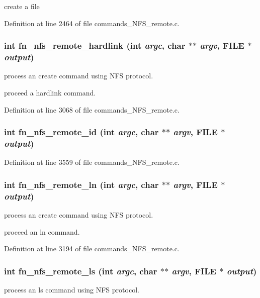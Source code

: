 create a file 

Definition at line 2464 of file commands\_\-NFS\_\-remote.c.
\subsubsection[{fn\_\-nfs\_\-remote\_\-hardlink}]{\setlength{\rightskip}{0pt plus 5cm}int fn\_\-nfs\_\-remote\_\-hardlink (int {\em argc}, \/  char $\ast$$\ast$ {\em argv}, \/  FILE $\ast$ {\em output})}\label{commands_8h_ad279971191c169cab4a91142e7346a68}
process an create command using NFS protocol.

proceed a hardlink command. 

Definition at line 3068 of file commands\_\-NFS\_\-remote.c.
\subsubsection[{fn\_\-nfs\_\-remote\_\-id}]{\setlength{\rightskip}{0pt plus 5cm}int fn\_\-nfs\_\-remote\_\-id (int {\em argc}, \/  char $\ast$$\ast$ {\em argv}, \/  FILE $\ast$ {\em output})}\label{commands_8h_adfe70596d1556c3acd01ba17fbe7bda8}


Definition at line 3559 of file commands\_\-NFS\_\-remote.c.
\subsubsection[{fn\_\-nfs\_\-remote\_\-ln}]{\setlength{\rightskip}{0pt plus 5cm}int fn\_\-nfs\_\-remote\_\-ln (int {\em argc}, \/  char $\ast$$\ast$ {\em argv}, \/  FILE $\ast$ {\em output})}\label{commands_8h_ae4a85d683c2bf488befc5192af4a2490}
process an create command using NFS protocol.

proceed an ln command. 

Definition at line 3194 of file commands\_\-NFS\_\-remote.c.
\subsubsection[{fn\_\-nfs\_\-remote\_\-ls}]{\setlength{\rightskip}{0pt plus 5cm}int fn\_\-nfs\_\-remote\_\-ls (int {\em argc}, \/  char $\ast$$\ast$ {\em argv}, \/  FILE $\ast$ {\em output})}\label{commands_8h_a2f6620b40e586fff30ce7325049d29a7}
process an ls command using NFS protocol.

